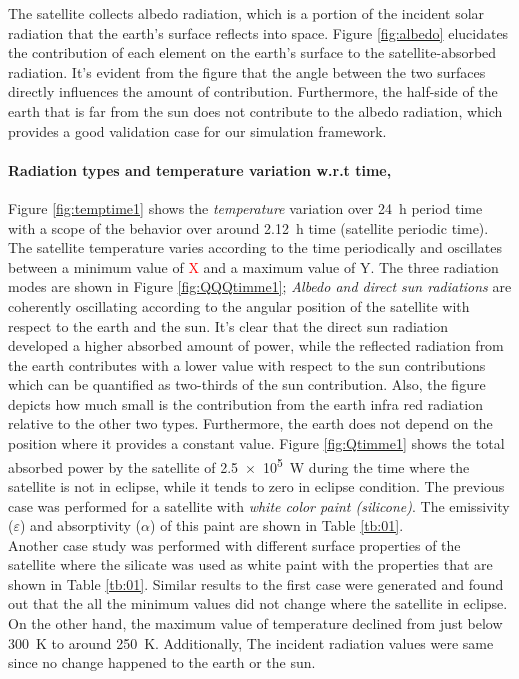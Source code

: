 \documentclass[11pt]{article}
\begin{document}
The satellite collects albedo radiation, which is a portion of the incident solar radiation that the earth's surface reflects into space. Figure \ref{fig:albedo} elucidates the contribution of each element on the earth's surface to the satellite-absorbed radiation. It's evident from the figure that the angle between the two surfaces directly influences the amount of contribution. Furthermore, the half-side of the earth that is far from the sun does not contribute to the albedo radiation, which provides a good validation case for our simulation framework.

 \newpage
\paragraph{Radiation types and temperature variation w.r.t time,}
Figure \ref{fig:temptime1} shows the \textit{temperature} variation over \SI{24}{\hour} period time with a scope of the behavior over around \SI{2.12}{\hour} time (satellite periodic time). The satellite temperature varies according to the time periodically and oscillates between a minimum value of \textcolor{red}{X} and a maximum value of Y. The three radiation modes are shown in Figure \ref{fig:QQQtimme1}; \textit{Albedo and direct sun radiations}  are coherently oscillating according to the angular position of the satellite with respect to the earth and the sun. It's clear that the direct sun radiation developed a higher absorbed amount of power, while the reflected radiation from the earth contributes with a lower value with respect to the sun contributions which can be quantified as two-thirds of the sun contribution. Also, the figure depicts how much small is the contribution from the earth infra red radiation relative to the other two types. Furthermore, the earth does not depend on the position where it provides a constant value. Figure \ref{fig:Qtimme1} shows the total absorbed power by the satellite of \SI{2.5e5}{\watt} during the time where the satellite is not in eclipse, while it tends to zero in eclipse condition. The previous case was performed for a satellite with \textit{white color paint (silicone)}. The emissivity ($\varepsilon$) and absorptivity ($\alpha$) of this paint are shown in Table \ref{tb:01}. \\

Another case study was performed with different surface properties of the satellite where the silicate was used as white paint with the properties that are shown in Table \ref{tb:01}. Similar results to the first case were generated and found out that the all the minimum values did not change where the satellite in eclipse. On the other hand, the maximum value of temperature declined from just below \SI{300}{\kelvin} to around \SI{250}{\kelvin}. Additionally, The incident radiation values were same since no change happened to the earth or the sun. \\
\end{document}

